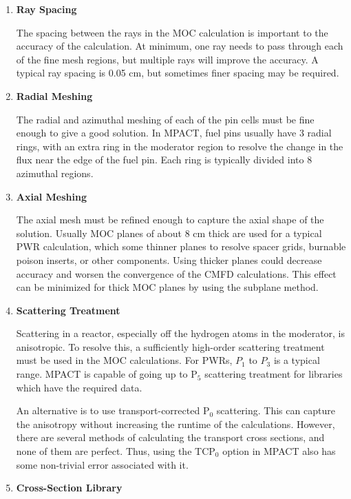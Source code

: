 \begin{enumerate}[leftmargin=*]
  \item \textbf{Ray Spacing}
  
  The spacing between the rays in the MOC calculation is important to the accuracy of the calculation.  At minimum, one ray needs to pass through each of the fine mesh regions, but multiple rays will improve the accuracy.  A typical ray spacing is 0.05 cm, but sometimes finer spacing may be required.
  
  \item \textbf{Radial Meshing}
  
  The radial and azimuthal meshing of each of the pin cells must be fine enough to give a good solution.  In MPACT, fuel pins usually have 3 radial rings, with an extra ring in the moderator region to resolve the change in the flux near the edge of the fuel pin.  Each ring is typically divided into 8 azimuthal regions.
  
  \item \textbf{Axial Meshing}
  
  The axial mesh must be refined enough to capture the axial shape of the solution.  Usually MOC planes of about 8 cm thick are used for a typical PWR calculation, which some thinner planes to resolve spacer grids, burnable poison inserts, or other components.  Using thicker planes could decrease accuracy and worsen the convergence of the CMFD calculations.  This effect can be minimized for thick MOC planes by using the subplane method.
  
  \item \textbf{Scattering Treatment}
  
  Scattering in a reactor, especially off the hydrogen atoms in the moderator, is anisotropic.  To resolve this, a sufficiently high-order scattering treatment must be used in the MOC calculations.  For PWRs, $P_1$ to $P_3$ is a typical range.  MPACT is capable of going up to P$_5$ scattering treatment for libraries which have the required data.
  
  An alternative is to use transport-corrected P$_0$ scattering.  This can capture the anisotropy without increasing the runtime of the calculations.  However, there are several methods of calculating the transport cross sections, and none of them are perfect.  Thus, using the TCP$_0$ option in MPACT also has some non-trivial error associated with it.
  
  \item \textbf{Cross-Section Library}
  

\end{enumerate}
